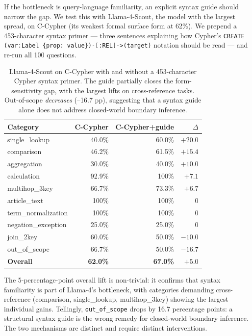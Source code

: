 If the bottleneck is query-language familiarity, an
explicit syntax guide should narrow the gap. We test this with
Llama-4-Scout, the model with the largest spread, on C-Cypher (its
weakest formal surface form at 62\%). We prepend a 453-character
syntax primer — three sentences explaining how Cypher's
\texttt{CREATE (var:Label \{prop: value\})-[:REL]->(target)}
notation should be read — and re-run all 100 questions.

\begin{table}[t]
\centering
\caption{Llama-4-Scout on C-Cypher with and without a 453-character
Cypher syntax primer. The guide partially closes the form-sensitivity
gap, with the largest lifts on cross-reference tasks. Out-of-scope
\emph{decreases} (--16.7 pp), suggesting that a syntax guide alone
does not address closed-world boundary inference.}
\label{tab:guide-cypher}
\small
\begin{tabular}{l rrr}
\toprule
Category & C-Cypher & C-Cypher+guide & $\Delta$ \\
\midrule
single\_lookup        & 40.0\% & 60.0\% & $+20.0$ \\
comparison            & 46.2\% & 61.5\% & $+15.4$ \\
aggregation           & 30.0\% & 40.0\% & $+10.0$ \\
calculation           & 92.9\% & 100\%  & $+7.1$  \\
multihop\_3key        & 66.7\% & 73.3\% & $+6.7$  \\
article\_text         & 100\%  & 100\%  & $0$     \\
term\_normalization   & 100\%  & 100\%  & $0$     \\
negation\_exception   & 25.0\% & 25.0\% & $0$     \\
join\_2key            & 60.0\% & 50.0\% & $-10.0$ \\
out\_of\_scope        & 66.7\% & 50.0\% & $-16.7$ \\
\midrule
\textbf{Overall}      & \textbf{62.0\%} & \textbf{67.0\%} & \textbf{$+5.0$} \\
\bottomrule
\end{tabular}
\end{table}

The 5-percentage-point overall lift is non-trivial: it confirms that
syntax familiarity is part of Llama-4's bottleneck, with categories
demanding cross-reference (comparison, single\_lookup,
multihop\_3key) showing the largest individual gains. Tellingly,
\texttt{out\_of\_scope} drops by 16.7 percentage points: a structural
syntax guide is the wrong remedy for closed-world boundary inference.
The two mechanisms are distinct and require distinct interventions.

